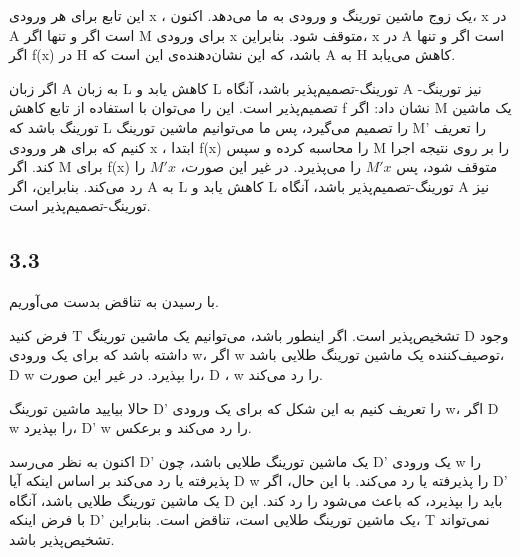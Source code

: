 
این تابع برای هر ورودی x ، یک زوج ماشین تورینگ و ورودی به ما می‌دهد. اکنون، x در A است اگر و تنها اگر M برای ورودی x متوقف شود. بنابراین، x در A است اگر و تنها اگر f(x) در H باشد، که این نشان‌دهنده‌ی این است که A به H کاهش می‌یابد.

اگر زبان A به زبان L کاهش یابد و L تورینگ-تصمیم‌پذیر باشد، آنگاه A نیز تورینگ-تصمیم‌پذیر است. این را می‌توان با استفاده از تابع کاهش f نشان داد: اگر M یک ماشین تورینگ باشد که L را تصمیم می‌گیرد، پس ما می‌توانیم ماشین تورینگ M' را تعریف کنیم که برای هر ورودی x ، ابتدا f(x) را محاسبه کرده و سپس M را بر روی نتیجه اجرا کند. اگر M برای f(x) متوقف شود، پس
$M' x$
  را می‌پذیرد. در غیر این صورت،
$M' x$
را رد می‌کند. بنابراین، اگر A به L کاهش یابد و L تورینگ-تصمیم‌پذیر باشد، آنگاه A نیز تورینگ-تصمیم‌پذیر است.


\subsection*{3.3}

با رسیدن به تناقض بدست می‌آوریم.

فرض کنید T تشخیص‌پذیر است. اگر اینطور باشد، می‌توانیم یک ماشین تورینگ D وجود داشته باشد که برای یک ورودی w، اگر w توصیف‌کننده یک ماشین تورینگ طلایی باشد، D w را بپذیرد. در غیر این صورت، D ، w را رد می‌کند.

حالا بیایید ماشین تورینگ D' را تعریف کنیم به این شکل که برای یک ورودی w، اگر D w را بپذیرد، D' w را رد می‌کند و برعکس.

اکنون به نظر می‌رسد D' یک ماشین تورینگ طلایی باشد، چون D' یک ورودی w را پذیرفته یا رد می‌کند بر اساس اینکه آیا D w را پذیرفته یا رد می‌کند. با این حال، اگر D' یک ماشین تورینگ طلایی باشد، آنگاه D باید
را بپذیرد، که باعث می‌شود
را رد کند. این با فرض اینکه D' یک ماشین تورینگ طلایی است، تناقض است. بنابراین، T نمی‌تواند تشخیص‌پذیر باشد.
